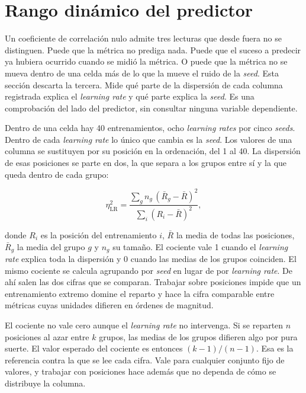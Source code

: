 \section{Rango dinámico del predictor}
\label{sec:res-rango}

Un coeficiente de correlación nulo admite tres lecturas que desde fuera no se distinguen. Puede que la métrica no prediga nada. Puede que el suceso a predecir ya hubiera ocurrido cuando se midió la métrica. O puede que la métrica no se mueva dentro de una celda más de lo que la mueve el ruido de la \emph{seed}. Esta sección descarta la tercera. Mide qué parte de la dispersión de cada columna registrada explica el \emph{learning rate} y qué parte explica la \emph{seed}. Es una comprobación del lado del predictor, sin consultar ninguna variable dependiente.

Dentro de una celda hay 40 entrenamientos, ocho \emph{learning rates} por cinco \emph{seeds}. Dentro de cada \emph{learning rate} lo único que cambia es la \emph{seed}. Los valores de una columna se sustituyen por su posición en la ordenación, del 1 al 40. La dispersión de esas posiciones se parte en dos, la que separa a los grupos entre sí y la que queda dentro de cada grupo:

\begin{equation}
\eta^2_{\mathrm{LR}} = \frac{\sum_{g} n_g\,(\bar{R}_g - \bar{R})^2}{\sum_{i} (R_i - \bar{R})^2},
\label{eq:eta-rangos}
\end{equation}

donde $R_i$ es la posición del entrenamiento $i$, $\bar{R}$ la media de todas las posiciones, $\bar{R}_g$ la media del grupo $g$ y $n_g$ su tamaño. El cociente vale 1 cuando el \emph{learning rate} explica toda la dispersión y 0 cuando las medias de los grupos coinciden. El mismo cociente se calcula agrupando por \emph{seed} en lugar de por \emph{learning rate}. De ahí salen las dos cifras que se comparan. Trabajar sobre posiciones impide que un entrenamiento extremo domine el reparto y hace la cifra comparable entre métricas cuyas unidades difieren en órdenes de magnitud.

El cociente no vale cero aunque el \emph{learning rate} no intervenga. Si se reparten $n$ posiciones al azar entre $k$ grupos, las medias de los grupos difieren algo por pura suerte. El valor esperado del cociente es entonces $(k-1)/(n-1)$. Esa es la referencia contra la que se lee cada cifra. Vale para cualquier conjunto fijo de valores, y trabajar con posiciones hace además que no dependa de cómo se distribuye la columna.

